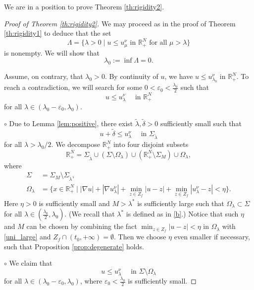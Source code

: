 \documentclass[reqno]{amsart}
\theoremstyle{plain}
\theoremstyle{definition}
\theoremstyle{remark}
\begin{document}
	We are in a position to prove Theorem \ref{th:rigidity2}.
	\begin{proof}[Proof of Theorem \ref{th:rigidity2}]
		We may proceed as in the proof of Theorem \ref{th:rigidity1} to deduce that the set
		\[
		\Lambda = \{ \lambda>0 \mid u \le u_\mu^\nu \text{ in } \mathbb{R}^N_+ \text{ for all } \mu > \lambda \}
		\]
		is nonempty. We will show that
		\[
		\lambda_0 := \inf \Lambda = 0.
		\]
		
		Assume, on contrary, that $\lambda_0>0$. By continuity of $u$, we have $u \le u_{\lambda_0}^\nu$ in $\mathbb{R}^N_+$. To reach a contradiction, we will search for some $0<\varepsilon_0<\frac{\lambda_0}{2}$ such that
		\begin{equation}\label{key2}
			u \le u_\lambda^\nu \quad\text{ in } \mathbb{R}^N_+
		\end{equation}
		for all $\lambda \in (\lambda_0-\varepsilon_0, \lambda_0)$.
		
		$\circ$ Due to Lemma \ref{lem:positive}, there exist $\tilde{\lambda},\tilde{\delta}>0$ sufficiently small such that
		\begin{equation}\label{u0}
			u+\tilde{\delta}\leq u_\lambda^\nu \quad\text{ in } \Sigma_{\tilde{\lambda}}
		\end{equation}
		for all $\lambda>\lambda_0/2$.
		We decompose $\mathbb{R}^N_+$ into four disjoint subsets
		\[
		\mathbb{R}^N_+ = \Sigma_{\tilde{\lambda}} \cup (\Sigma\setminus \Omega_\lambda) \cup (\mathbb{R}^N_+\setminus\Sigma_M )\cup  \Omega_\lambda,
		\]
		where
		\begin{align*}
			\Sigma &= \Sigma_M\setminus\Sigma_{\tilde{\lambda}},\\
			\Omega_\lambda &= \{x\in\mathbb{R}^N_+ \mid |\nabla u| + |\nabla u_\lambda^\nu| + \min_{z\in Z_f}|u-z| + \min_{z\in Z_f}|u_\lambda^\nu-z| < \eta\}.
		\end{align*}
		Here $\eta>0$ is sufficiently small and $M>\lambda^*$ is sufficiently large such that $\Omega_\lambda\subset\Sigma$ for all $\lambda \in (\frac{\lambda_0}{2}, \lambda_0)$. (We recall that $\lambda^*$ is defined as in \eqref{b}.) Notice that such $\eta$ and $M$ can be chosen by combining the fact $\min_{z\in Z_f}|u-z|<\eta$ in $\Omega_\lambda$ with \eqref{uni_large} and $Z_f\cap(t_0,+\infty)=\emptyset$. Then we choose $\eta$ even smaller if necessary, such that Proposition \ref{prop:degenerate} holds.
		
		$\circ$ We claim that
		\begin{equation}\label{u1}
			u \le u_\lambda^\nu \quad\text{ in } \Sigma\setminus \Omega_\lambda
		\end{equation}
		for all $\lambda \in (\lambda_0-\varepsilon_0, \lambda_0)$, where $\varepsilon_0<\frac{\lambda_0}{2}$ is sufficiently small.
		

\end{proof}
\end{document}
